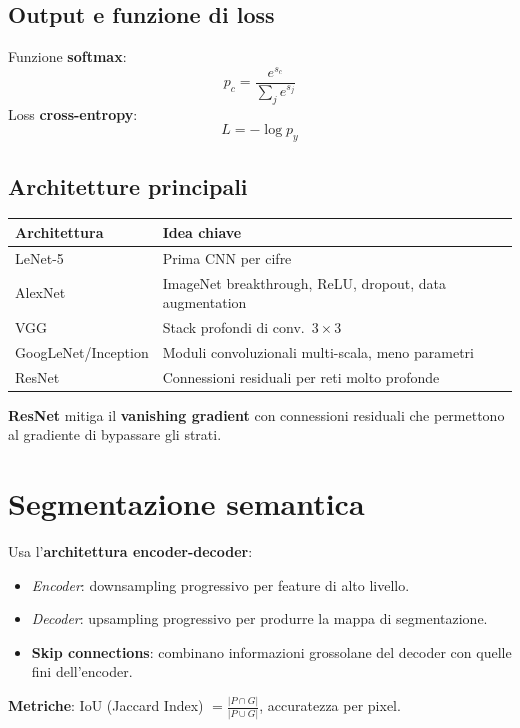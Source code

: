 \documentclass[12pt, a4paper]{report}
\begin{document}
\subsection{Output e funzione di loss}

Funzione \textbf{softmax}:
\[
  p_c=\frac{e^{s_c}}{\sum_j e^{s_j}}
\]
Loss \textbf{cross-entropy}:
\[
  L=-\log p_y
\]

\subsection{Architetture principali}

\begin{center}
\begin{tabular}{ll}
\toprule
\textbf{Architettura}&\textbf{Idea chiave}\\
\midrule
LeNet-5            & Prima CNN per cifre\\
AlexNet            & ImageNet breakthrough, ReLU, dropout, data augmentation\\
VGG                & Stack profondi di conv.\ $3\times3$\\
GoogLeNet/Inception& Moduli convoluzionali multi-scala, meno parametri\\
ResNet             & Connessioni residuali per reti molto profonde\\
\bottomrule
\end{tabular}
\end{center}

\textbf{ResNet} mitiga il \textbf{vanishing gradient} con connessioni residuali
che permettono al gradiente di bypassare gli strati.

\section{Segmentazione semantica}

Usa l'\textbf{architettura encoder-decoder}:
\begin{itemize}
  \item \textit{Encoder}: downsampling progressivo per feature di alto livello.
  \item \textit{Decoder}: upsampling progressivo per produrre la mappa di
        segmentazione.
  \item \textbf{Skip connections}: combinano informazioni grossolane del decoder
        con quelle fini dell'encoder.
\end{itemize}

\textbf{Metriche}: IoU (Jaccard Index) $=\frac{|P\cap G|}{|P\cup G|}$,
accuratezza per pixel.
\end{document}
